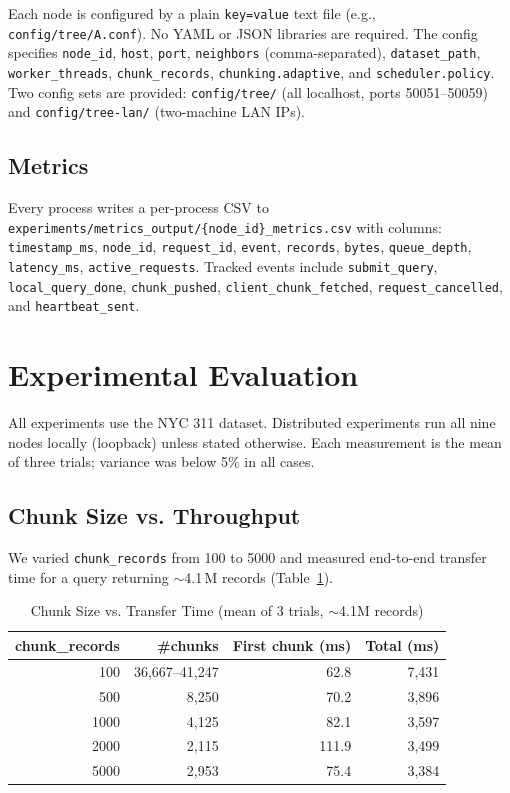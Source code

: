 \documentclass[conference]{IEEEtran}
\begin{document}
Each node is configured by a plain \texttt{key=value} text file (e.g.,
\texttt{config/tree/A.conf}). No YAML or JSON libraries are required. The
config specifies \texttt{node\_id}, \texttt{host}, \texttt{port},
\texttt{neighbors} (comma-separated), \texttt{dataset\_path},
\texttt{worker\_threads}, \texttt{chunk\_records},
\texttt{chunking.adaptive}, and \texttt{scheduler.policy}. Two config sets
are provided: \texttt{config/tree/} (all localhost, ports 50051--50059) and
\texttt{config/tree-lan/} (two-machine LAN IPs).

\subsection{Metrics}

Every process writes a per-process CSV to
\texttt{experiments/metrics\_output/\{node\_id\}\_metrics.csv} with columns:
\texttt{timestamp\_ms}, \texttt{node\_id}, \texttt{request\_id},
\texttt{event}, \texttt{records}, \texttt{bytes}, \texttt{queue\_depth},
\texttt{latency\_ms}, \texttt{active\_requests}.
Tracked events include \texttt{submit\_query}, \texttt{local\_query\_done},
\texttt{chunk\_pushed}, \texttt{client\_chunk\_fetched},
\texttt{request\_cancelled}, and \texttt{heartbeat\_sent}.

\section{Experimental Evaluation}
\label{sec:experiments}

All experiments use the NYC 311 dataset. Distributed experiments run all nine
nodes locally (loopback) unless stated otherwise. Each measurement is the mean
of three trials; variance was below 5\% in all cases.

\subsection{Chunk Size vs. Throughput}
\label{sec:exp:chunk}

We varied \texttt{chunk\_records} from 100 to 5000 and measured end-to-end
transfer time for a query returning $\sim$4.1\,M records
(Table~\ref{tab:chunk}).

\begin{table}[h]
\centering
\caption{Chunk Size vs. Transfer Time (mean of 3 trials, $\sim$4.1M records)}
\label{tab:chunk}
\begin{tabular}{rrrr}
\toprule
chunk\_records & \#chunks & First chunk (ms) & Total (ms) \\
\midrule
100  & 36{,}667--41{,}247 & 62.8 & 7{,}431 \\
500  & 8{,}250 & 70.2 & 3{,}896 \\
1000 & 4{,}125 & 82.1 & 3{,}597 \\
2000 & 2{,}115 & 111.9 & 3{,}499 \\
5000 & 2{,}953 & 75.4 & 3{,}384 \\
\bottomrule
\end{tabular}
\end{table}
\end{document}
